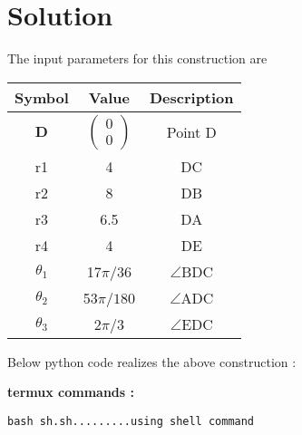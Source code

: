 \documentclass[10pt, a4paper]{article}
\newcommand{\myvec}[1]{\ensuremath{\begin{pmatrix}#1\end{pmatrix}}}
\let\vec\mathbf
\begin{document}
   \section{Solution}
The input parameters for this construction are 
\begin{center}
\begin{tabular}{|c|c|c|}
	\hline
	\textbf{Symbol}&\textbf{Value}&\textbf{Description}\\
	\hline
	$\vec{D}$ & $\myvec{0\\0}$ & Point D\\
	\hline
	r1&4&DC\\
	\hline
	r2&8&DB\\
	\hline
	r3&6.5&DA\\
	\hline
	r4&4&DE\\
	\hline
	${\theta}_1$& 17$\pi/36$&$ \angle $BDC\\ 
	\hline
	${\theta}_2$& 53$\pi/180$&$ \angle $ADC\\ 
	\hline
	${\theta}_3$& 2$\pi/3$&$ \angle $EDC\\ 
	\hline
\end{tabular}
\end{center}
\begin{center}
Below python code realizes the above construction :
\end{center}
\textbf{termux commands :}
\begin{lstlisting}
bash sh.sh.........using shell command
\end{lstlisting}
\end{document}
